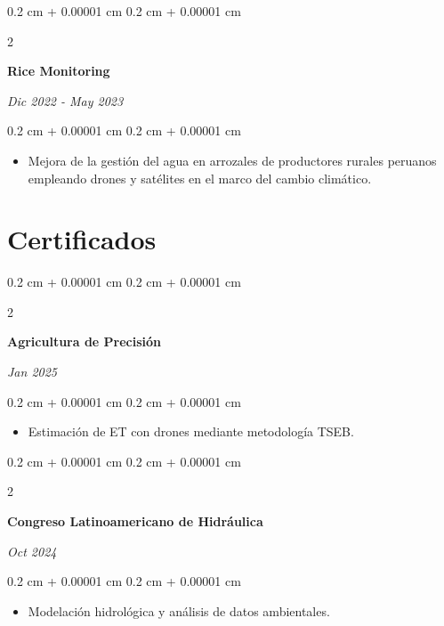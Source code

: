 \documentclass[10pt, letterpaper]{article}
\newenvironment{highlights}{
    \begin{itemize}[
        topsep=0.10 cm,
        parsep=0.10 cm,
        partopsep=0pt,
        itemsep=0pt,
        leftmargin=0.4 cm + 10pt
    ]
}{
    \end{itemize}
} %
\newenvironment{onecolentry}{
    \begin{adjustwidth}{
        0.2 cm + 0.00001 cm
    }{
        0.2 cm + 0.00001 cm
    }
}{
    \end{adjustwidth}
} %
\newenvironment{twocolentry}[2][]{
    \onecolentry
    \def\secondColumn{#2}
    \setcolumnwidth{\fill, 4.5 cm}
    \begin{paracol}{2}
}{
    \switchcolumn \raggedleft \secondColumn
    \end{paracol}
    \endonecolentry
} %
\begin{document}
        \vspace{0.2 cm}

        \begin{twocolentry}{
            
            
        \textit{Dic 2022 - May 2023}}
            \textbf{Rice Monitoring}
        \end{twocolentry}

        \vspace{0.10 cm}
        \begin{onecolentry}
            \begin{highlights}
                \item Mejora de la gestión del agua en arrozales de productores rurales peruanos empleando drones y satélites en el marco del cambio climático.
            \end{highlights}
        \end{onecolentry}


    
\section{Certificados}

\begin{twocolentry}{
    \textit{Jan 2025}
}
\textbf{Agricultura de Precisión}
\end{twocolentry}

\vspace{0.10 cm}
\begin{onecolentry}
  \begin{highlights}
    \item Estimación de ET con drones mediante metodología TSEB.
  \end{highlights}
\end{onecolentry}

\vspace{0.2 cm}

\begin{twocolentry}{
    \textit{Oct 2024}
}
\textbf{Congreso Latinoamericano de Hidráulica}
\end{twocolentry}

\vspace{0.10 cm}
\begin{onecolentry}
  \begin{highlights}
    \item Modelación hidrológica y análisis de datos ambientales.
  \end{highlights}
\end{onecolentry}
\end{document}
